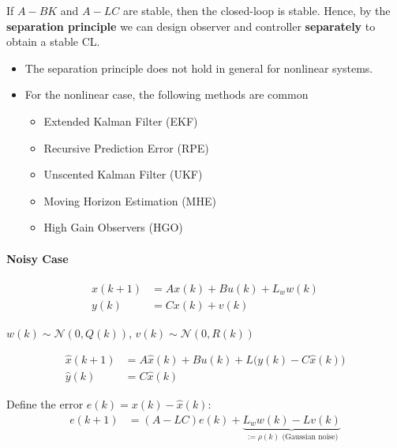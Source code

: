 If $A - BK$ and $A - LC$ are stable, then the closed-loop is stable. Hence, by the \textbf{separation principle} we can design observer and controller \textbf{separately} to obtain a stable CL.

\newpar{}

\begin{itemize}
    \item The separation principle does not hold in general for nonlinear systems.
    \item For the nonlinear case, the following methods are common
          \begin{itemize}
              \item Extended Kalman Filter (EKF)
              \item Recursive Prediction Error (RPE)
              \item Unscented Kalman Filter (UKF)
              \item Moving Horizon Estimation (MHE)
              \item High Gain Observers (HGO)
          \end{itemize}
\end{itemize}
\paragraph{Noisy Case}

\begin{align*}
    x(k{+}1) & = Ax(k) + Bu(k) + L_w w(k) \\
    y(k)     & = Cx(k) + v(k)
\end{align*}

$w(k) \sim \mathcal{N}(0, Q(k))$, \quad $v(k) \sim \mathcal{N}(0, R(k))$

\newpar{}
\begin{align*}
    \hat{x}(k{+}1) & = A\hat{x}(k) + Bu(k) + L\big(y(k) - C\hat{x}(k) \big) \\
    \hat{y}(k)     & = C\hat{x}(k)
\end{align*}

\newpar{}

Define the error $e(k) = x(k) - \hat{x}(k)$:
\begin{align*}
    e(k{+}1) & = (A - L C)e(k) + \underbrace{L_w w(k) - L v(k)}_{:=\rho(k)\text{ (Gaussian noise)}} \\
\end{align*}

\newpar{}

